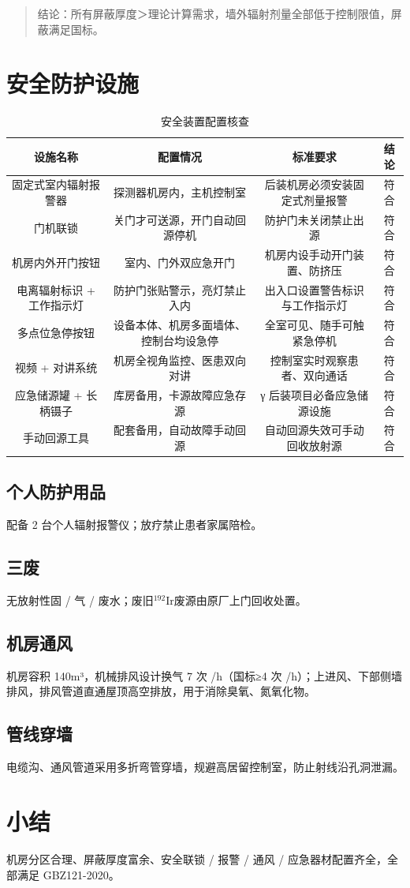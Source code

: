 \begin{quote}
结论：所有屏蔽厚度＞理论计算需求，墙外辐射剂量全部低于控制限值，屏蔽满足国标。
\end{quote}

\section{安全防护设施}


\begin{table}[H]
\centering
\caption{安全装置配置核查}
\begin{tabular}{|c|c|c|c|}
\hline
设施名称 & 配置情况 & 标准要求 & 结论 \\
\hline
固定式室内辐射报警器 & 探测器机房内，主机控制室 & 后装机房必须安装固定式剂量报警 & 符合 \\
\hline
门机联锁 & 关门才可送源，开门自动回源停机 & 防护门未关闭禁止出源 & 符合 \\
\hline
机房内外开门按钮 & 室内、门外双应急开门 & 机房内设手动开门装置、防挤压 & 符合 \\
\hline
电离辐射标识 + 工作指示灯 & 防护门张贴警示，亮灯禁止入内 & 出入口设置警告标识与工作指示灯 & 符合 \\
\hline
多点位急停按钮 & 设备本体、机房多面墙体、控制台均设急停 & 全室可见、随手可触紧急停机 & 符合 \\
\hline
视频 + 对讲系统 & 机房全视角监控、医患双向对讲 & 控制室实时观察患者、双向通话 & 符合 \\
\hline
应急储源罐 + 长柄镊子 & 库房备用，卡源故障应急存源 & γ 后装项目必备应急储源设施 & 符合 \\
\hline
手动回源工具 & 配套备用，自动故障手动回源 & 自动回源失效可手动回收放射源 & 符合 \\
\hline
\end{tabular}
\end{table}


\subsection{个人防护用品}

配备 2 台个人辐射报警仪；放疗禁止患者家属陪检。

\subsection{三废}

无放射性固 / 气 / 废水；废旧$^{192}\text{Ir}$废源由原厂上门回收处置。

\subsection{机房通风}

机房容积 140m³，机械排风设计换气 7 次 /h（国标≥4 次 /h）；上进风、下部侧墙排风，排风管道直通屋顶高空排放，用于消除臭氧、氮氧化物。

\subsection{管线穿墙}

电缆沟、通风管道采用多折弯管穿墙，规避高居留控制室，防止射线沿孔洞泄漏。

\section{小结}

机房分区合理、屏蔽厚度富余、安全联锁 / 报警 / 通风 / 应急器材配置齐全，全部满足 GBZ121-2020。

